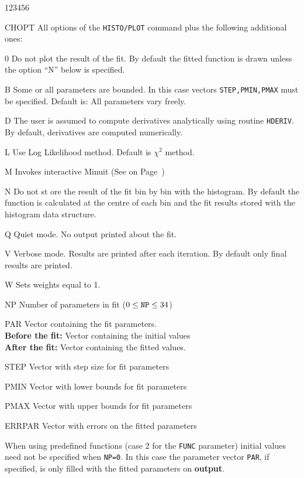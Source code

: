 \begin{DLtt}{123456}
\item[CHOPT]  All options of the \texttt{HISTO/PLOT} command plus the following
              additional ones:
\begin{DLtt}{1}
\item[0] Do not plot the result of the fit. By default the fitted
         function is drawn unless the option ``N'' below is specified.
\item[B] Some or all parameters are bounded.
         In this case vectors \texttt{STEP,PMIN,PMAX} must be specified.
         Default is: All parameters vary freely.
\item[D] The user is assumed to compute derivatives analytically using
         routine \texttt{HDERIV}. By default, derivatives are computed numerically.
\item[L] Use Log Likelihood method. Default is \(\chi^2\) method.
\item[M] Invokes interactive Minuit (See on Page~\pageref{sec:H2MWMIN})
\item[N] Do not st ore the result of the fit bin by bin with the histogram.
         By default the function is calculated at the centre of each bin
         and the fit results stored with the histogram data structure.
\item[Q] Quiet mode. No output printed about the fit.
\item[V] Verbose mode. Results are printed after each iteration.
         By default only final results are printed.
\item[W] Sets weights equal to 1.
\end{DLtt}
\item[NP]    Number of parameters in fit (\(0\leq \mbox{\tt NP}\leq 34\))
\item[PAR]   Vector containing the fit parameters.\\
             {\bf Before the fit:} Vector containing the initial values\\
             {\bf After the fit:} Vector containing the fitted values.
\item[STEP]  Vector with step size for fit parameters
\item[PMIN]  Vector with lower bounds for fit parameters
\item[PMAX]  Vector with upper bounds for fit parameters
\item[ERRPAR] Vector with errors on the fitted parameters
\end{DLtt}

When using predefined functions (case 2 for the \texttt{FUNC} parameter)
initial values need not be specified when \texttt{NP=0}.
In this case the parameter vector \texttt{PAR}, if specified,
is only filled
with the fitted parameters on {\bf output}.

